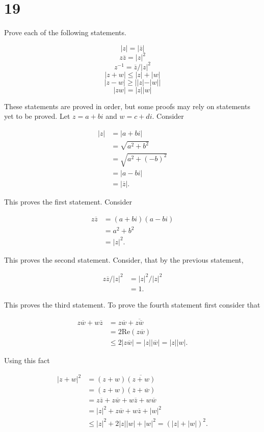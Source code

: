 \documentclass[a4paper]{article}
\begin{document}
\section*{19}

Prove each of the following statements.

$$|z| = |\overline{z}|$$
$$z \overline{z} = |z|^2$$
$$z^{-1} = \overline{z} / |z|^2$$
$$|z+w| \leq |z| + |w|$$
$$|z-w| \geq ||z| - |w||$$
$$|zw| = |z||w| $$

These statements are proved in order, but some proofs may rely on statements yet to be proved. Let $z = a + bi$ and $w = c + di$. Consider

\begin{align*}
|z| &= |a + bi| \\
&= \sqrt{a^2 + b^2} \\
&= \sqrt{a^2 + (-b)^2} \\
&= |a - bi| \\
&= |\overline{z}|.
\end{align*}

This proves the first statement. Consider

\begin{align*}
z \overline{z} &= (a + bi)(a - bi) \\
&= a^2 + b^2 \\
&= |z|^2.
\end{align*}

This proves the second statement. Consider, that by the previous statement,

\begin{align*}
z \overline{z} / |z|^2 &= |z|^2 / |z|^2 \\
&= 1.
\end{align*}

This proves the third statement. To prove the fourth statement first consider that

\begin{align*}
z \overline{w} + w \overline{z} &= z \overline{w} + \overline{z \overline{w}} \\
&= 2 \text{Re} (z \overline{w}) \\
&\leq 2 |z \overline{w}| = |z||\overline{w}| = |z||w|.
\end{align*}

Using this fact

\begin{align*}
|z+w|^2 &= (z+w) \overline{(z+w)} \\
&= (z+w) (\overline{z} + \overline{w}) \\
&= z \overline{z} + z \overline{w} + w \overline{z} + w \overline{w} \\
&= |z|^2 + z \overline{w} + w \overline{z} + |w|^2 \\
&\leq |z|^2 + 2|z||w| + |w|^2 = (|z| + |w|)^2.
\end{align*}
\end{document}
